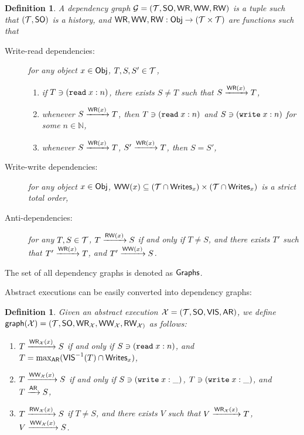 \documentclass[a4paper,UKenglish]{article}%
\newtheorem{definition}[theorem]{Definition}
\theoremstyle{plain}
\begin{document}
\begin{definition}
A dependency graph $\mathcal{G} = (\mathcal{T}, {\sf{SO}}, {\mathsf{WR}}, {\mathsf{WW}}, {\mathsf{RW}})$ is a
tuple such that $(\mathcal{T}, {\sf{SO}})$ is a history, and ${\mathsf{WR}}, {\mathsf{WW}}, {\mathsf{RW}}: \mathsf{Obj} \rightarrow (\mathcal{T} \times \mathcal{T})$ 
are functions such that
\begin{description}
\item[Write-read dependencies: ] for any object $x \in \mathsf{Obj}$, $T,S,S' \in \mathcal{T}$, 
\begin{enumerate}
\item if $T \ni ({{\tt read}}\;x:n)$, there exists $S \neq T$ such that $S \xrightarrow{{\mathsf{WR}}(x)} T$, 
\item whenever $S \xrightarrow{{\mathsf{WR}}(x)} T$, then $T \ni ({{\tt read}}\;x:n)$ and $S \ni ({{\tt write}}\;x:n)$ 
for some $n \in \mathbb{N}$, 
\item whenever $S \xrightarrow{{\mathsf{WR}}(x)} T$, $S' \xrightarrow{{\mathsf{WR}}(x)} T$, then $S = S'$,
\end{enumerate}
\item[Write-write dependencies: ] for any object $x \in \mathsf{Obj}$, ${\mathsf{WW}}(x) \subseteq (\mathcal{T} \cap {\sf{Writes}}_x) \times (\mathcal{T} \cap {\sf{Writes}}_x)$ is a strict total 
order,
\item[Anti-dependencies: ] for any $T,S \in \mathcal{T}$, $T \xrightarrow{{\mathsf{RW}}(x)} S$ if and only if $T \neq S$, and there exists $T'$ 
such that $T' \xrightarrow{{\mathsf{WR}}(x)} T$, and $T' \xrightarrow{{\mathsf{WW}}(x)} S$.
\end{description}
\end{definition}
The set of all dependency graphs is denoted as $\mathsf{Graphs}$.

Abstract executions can be easily converted into dependency graphs: 
\begin{definition}
Given an abstract execution $\mathcal{X} = (\mathcal{T}, {\sf{SO}}, {\mathsf{VIS}}, {\sf{AR}})$, we define 
$\mathsf{graph}(\mathcal{X}) = (\mathcal{T}, {\sf{SO}}, {\mathsf{WR}}_{\mathcal{X}}, {\mathsf{WW}}_{\mathcal{X}}, {\mathsf{RW}}_{\mathcal{X})}$ as follows: 
\begin{enumerate} 
\item $T \xrightarrow{{\mathsf{WR}}_{\mathcal{X}}(x)} S$ if and only if $S \ni ({{\tt read}}\;x: n)$, and 
$T = \max_{{\sf{AR}}}({\mathsf{VIS}}^{-1}(T) \cap {\sf{Writes}}_x)$, 
\item $T \xrightarrow{{\mathsf{WW}}_{\mathcal{X}}(x)} S$ if and only if $S \ni ({{\tt write}}\;x: \_)$, 
$T \ni ({{\tt write}}\;x: \_)$, and $T \xrightarrow{{\sf{AR}}} S$, 
\item $T \xrightarrow{{\mathsf{RW}}_{\mathcal{X}}(x)} S$ if $T \neq S$, and there exists 
$V$ such that $V \xrightarrow{{\mathsf{WR}}_{\mathcal{X}}(x)} T$, $V \xrightarrow{{\mathsf{WW}}_{\mathcal{X}}(x)} S$.
\end{enumerate}
\end{definition}
\end{document}
